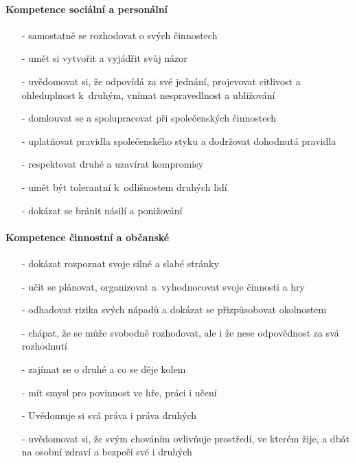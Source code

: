 				\paragraph{Kompetence sociální a personální}
				\begin{itemize}
				\setlength\itemsep{-2mm}
				\item[-] samostatně se rozhodovat o svých činnostech
				\item[-] umět si vytvořit a vyjádřit svůj názor
				\item[-] uvědomovat si, že odpovídá za své jednání, projevovat citlivost a ohleduplnost k druhým, vnímat nespravedlnost a ubližování
				\item[-] domlouvat se a spolupracovat při společenských činnostech
				\item[-] uplatňovat pravidla společenského styku a dodržovat dohodnutá pravidla 
				\item[-] respektovat druhé a uzavírat kompromisy 
				\item[-] umět být tolerantní k odlišnostem druhých lidí
				\item[-] dokázat se bránit násilí a ponižování
				\end{itemize}

				\paragraph{Kompetence činnostní a občanské}
				\begin{itemize}
				\setlength\itemsep{-2mm}
				\item[-] dokázat rozpoznat svoje silné a slabé stránky
				\item[-] učit se plánovat, organizovat a vyhodnocovat svoje činnosti a hry
				\item[-] odhadovat rizika svých nápadů a dokázat se přizpůsobovat okolnostem
				\item[-] chápat, že se může svobodně rozhodovat, ale i že nese odpovědnost za svá rozhodnutí
				\item[-] zajímat se o druhé a co se děje kolem
				\item[-] mít smysl pro povinnost ve hře, práci i učení
				\item[-] Uvědomuje si svá práva i práva druhých
				\item[-] uvědomovat si, že svým chováním ovlivňuje prostředí, ve kterém žije, a dbát na osobní zdraví a bezpečí své i druhých
				\end{itemize}



